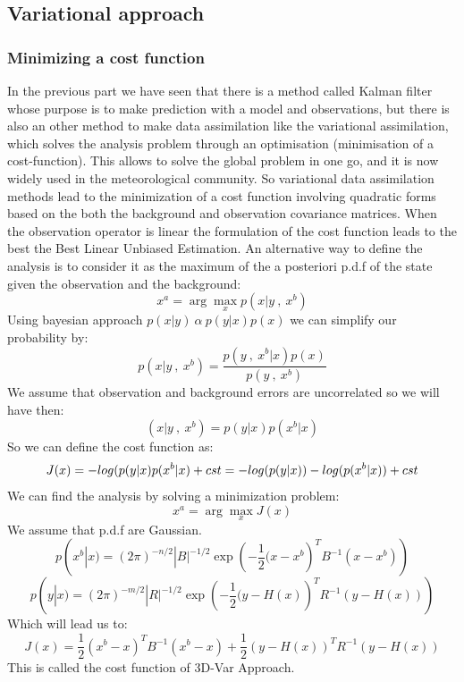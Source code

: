 \subsection{Variational approach}
\subsubsection{Minimizing a cost function}
\noindent In the previous part we have seen that there is a method called Kalman filter whose purpose is to make prediction with a model and observations, but there is also an other method to make data assimilation like the variational assimilation, which solves the analysis problem through an optimisation (minimisation of a cost-function). This allows to solve the global problem in one go, and it is now widely used in the meteorological community. So variational data assimilation methods lead to the minimization of a cost function involving quadratic forms based on the both the background and observation covariance matrices. When the observation operator is linear the formulation of the cost function leads to the best the Best Linear Unbiased Estimation. An alternative way to define the analysis is to consider it as the maximum of the a posteriori p.d.f of the state given the observation and the background:
$$x^a=\arg\max_{x}p(x|y ~ , ~ x^b)$$
Using bayesian approach $p(x|y)~\alpha~ p(y|x)p(x)$ we can simplify our probability by:
$$p(x|y ~ , ~ x^b)=\frac{p(y ~ , ~ x^b| x)p(x)}{p(y ~ , ~ x^b)}$$
We assume that observation and background errors are uncorrelated so we will have then:
$$(x|y ~ , ~ x^b)=p(y|x)p(x^b|x)$$
So we can define the cost function as:
$$J(x)=-log(p(y|x)p(x^b|x)+cst \\
=-log(p(y|x))-log(p(x^b|x))+cst$$
We can find the analysis by solving a minimization problem:
$$x^a=\arg\max_{x}J(x)$$
We assume that p.d.f are Gaussian.
$$p(x^b|x)=(2\pi)^{-n/2}|B|^{-1/2}\exp({-\frac{1}{2}(x-x^b})^TB^{-1}(x-x^b))$$
$$p(y|x)=(2\pi)^{-m/2}|R|^{-1/2}\exp({-\frac{1}{2}(y-H(x)})^TR^{-1}(y-H(x)))$$
Which will lead us to:
$$J(x)=\frac{1}{2}(x^b-x)^TB^{-1}(x^b-x)+\frac{1}{2}(y-H(x))^TR^{-1}(y-H(x))$$
This is called the cost function of 3D-Var Approach.
